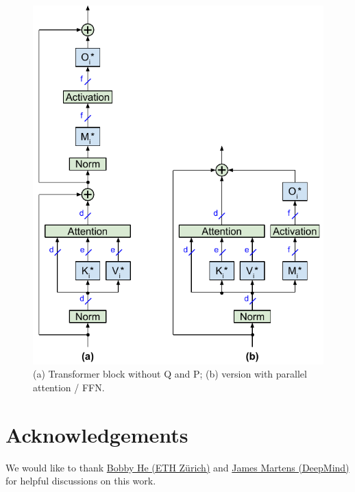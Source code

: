 \documentclass{article}
\begin{document}
\begin{figure} \centering
  \includegraphics[scale=0.92]{../doc/fig/removeWeights_fig4.pdf}
  \caption{(a) Transformer block without Q and P; (b) version with parallel attention / FFN.}
\label{fig4} \end{figure}

\section*{Acknowledgements}
We would like to thank \href{https://scholar.google.com/citations?user=HKft_LAAAAAJ&hl=en}{Bobby He (ETH Zürich)} and \href{https://scholar.google.com/citations?user=LlK_saMAAAAJ&hl=en}{James Martens (DeepMind)} for helpful discussions on this work.



\end{document}

